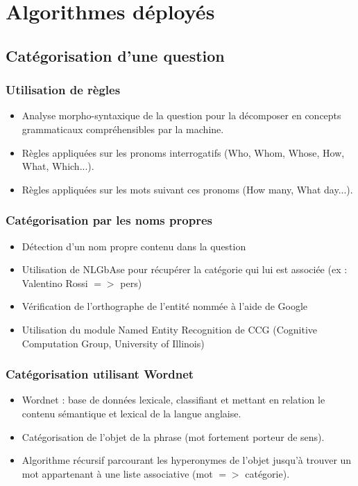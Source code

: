 \documentclass[xcolor=dvipsnames]{beamer}
\begin{document}
\section{Algorithmes déployés}
\subsection{Catégorisation d'une question}
\frame
{
    \frametitle{Utilisation de règles}
    \begin{itemize}
      \item<1-> Analyse morpho-syntaxique de la question pour la décomposer en concepts grammaticaux compréhensibles par la machine.
      \item<2-> Règles appliquées sur les pronoms interrogatifs (Who, Whom, Whose, How, What, Which...).
      \item<3-> Règles appliquées sur les mots suivant ces pronoms (How many, What day...).
    \end{itemize}
}
\frame 
{
    \frametitle{Catégorisation par les noms propres}
    \begin{itemize}
      \item<1-> Détection d'un nom propre contenu dans la question
      \item<2-> Utilisation de NLGbAse pour récupérer la catégorie qui lui est associée (ex : Valentino Rossi $=>$ pers)
      \item<3-> Vérification de l'orthographe de l'entité nommée à l'aide de Google
      \item<4-> Utilisation du module Named Entity Recognition de CCG (Cognitive Computation Group, University of Illinois)
    \end{itemize}
}
\frame 
{
    \frametitle{Catégorisation utilisant Wordnet}
    \begin{itemize}
      \item<1-> Wordnet : base de données lexicale, classifiant et mettant en relation le contenu sémantique et lexical de la langue anglaise.
      \item<2-> Catégorisation de l'objet de la phrase (mot fortement porteur de sens).
      \item<3-> Algorithme récursif parcourant les hyperonymes de l'objet jusqu'à trouver un mot appartenant à une liste associative (mot $=>$ catégorie).
    \end{itemize}
}
\end{document}
